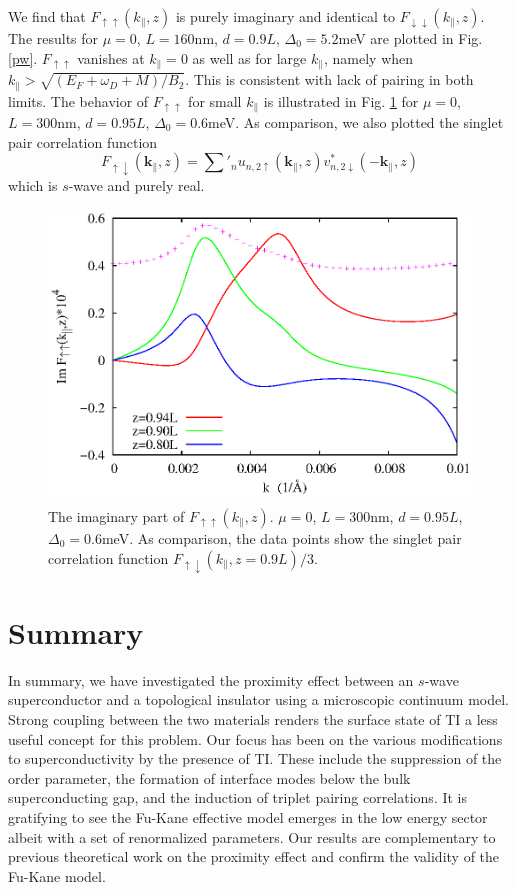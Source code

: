 We find that $F_{\uparrow\uparrow}(k_\parallel,z)$ is 
purely imaginary and identical to $F_{\downarrow\downarrow}(k_\parallel,z)$.
The results for $\mu=0$, $L=160$nm, $d=0.9L$, $\Delta_0=5.2$meV are plotted
in Fig. \ref{pw}. $F_{\uparrow\uparrow}$ vanishes at $k_\parallel=0$
as well as for large $k_\parallel$, namely when $k_\parallel>\sqrt{(E_F+\omega_D+M)/B_2}$.
This is consistent with lack of pairing in both limits. 
The behavior of $F_{\uparrow\uparrow}$ for small $k_\parallel$
is illustrated in Fig. \ref{pw-cu} for $\mu=0$, $L=300$nm, $d=0.95L$, 
$\Delta_0=0.6$meV. As comparison, we also plotted the singlet
 pair correlation function 
\begin{equation}
F_{\uparrow\downarrow}(\mathbf{k}_\parallel,z)=\sum'_n u_{n,2\uparrow}(\mathbf{k}_\parallel,z)
v^*_{n,2\downarrow}(-\mathbf{k}_\parallel,z)
\end{equation}
which is $s$-wave and purely real.

\begin{figure}
\center
\includegraphics[width=\textwidth]{include/pw-cu.eps}
\caption{The imaginary part of 
$F_{\uparrow\uparrow}(k_\parallel,z)$. $\mu=0$, $L=300$nm, $d=0.95L$, $\Delta_0=0.6$meV.
As comparison, the data points show the singlet pair correlation function 
$F_{\uparrow\downarrow}(k_\parallel,z=0.9L)/3$.
}\label{pw-cu}
\end{figure}

\section{Summary}
In summary, we have investigated the proximity effect between an $s$-wave superconductor
and a topological insulator using a microscopic continuum model. 
Strong coupling between the two materials renders the surface state of TI a less 
useful concept for this problem.
Our focus has been on the various modifications to superconductivity by the presence of TI. 
These include the suppression of the order parameter, the formation of interface modes
below the bulk superconducting gap, and the induction of triplet pairing correlations.
It is gratifying to see the Fu-Kane effective model emerges in the low energy sector
albeit with a set of renormalized parameters. Our results are complementary to
previous theoretical work on the proximity effect \cite{f-k,stan} and confirm the validity
of the Fu-Kane model.


